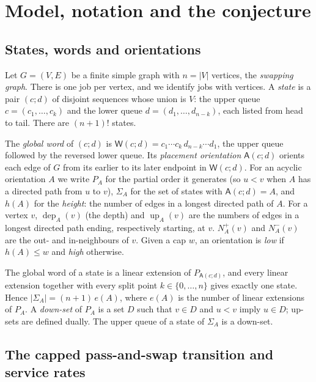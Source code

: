 \documentclass[11pt,a4paper]{article}
\theoremstyle{plain}
\theoremstyle{plain}
\newcommand{\W}{\mathsf{W}}
\newcommand{\Or}{\mathsf{A}}
\newcommand{\dep}{\operatorname{dep}}
\newcommand{\up}{\operatorname{up}}
\newcommand{\Nout}{N^{+}}
\newcommand{\Nin}{N^{-}}
\newcommand{\Sg}{\Sigma}
\begin{document}
\section{Model, notation and the conjecture}\label{sec:model}

\subsection{States, words and orientations}

Let $G=(V,E)$ be a finite simple graph with $n=|V|$ vertices, the \emph{swapping graph}. There is one job per vertex, and we identify jobs with vertices. A \emph{state} is a pair $(c;d)$ of disjoint sequences whose union is $V$: the upper queue $c=(c_1,\dots,c_k)$ and the lower queue $d=(d_1,\dots,d_{n-k})$, each listed from head to tail. There are $(n+1)!$ states.

\begin{definition}\label{def:orient}
The \emph{global word} of $(c;d)$ is $\W(c;d)=c_1\cdots c_k\,d_{n-k}\cdots d_1$, the upper queue followed by the reversed lower queue. Its \emph{placement orientation} $\Or(c;d)$ orients each edge of $G$ from its earlier to its later endpoint in $\W(c;d)$. For an acyclic orientation $A$ we write $P_A$ for the partial order it generates (so $u<v$ when $A$ has a directed path from $u$ to $v$), $\Sg_A$ for the set of states with $\Or(c;d)=A$, and $h(A)$ for the \emph{height}: the number of edges in a longest directed path of $A$. For a vertex $v$, $\dep_A(v)$ (the depth) and $\up_A(v)$ are the numbers of edges in a longest directed path ending, respectively starting, at $v$. $\Nout_A(v)$ and $\Nin_A(v)$ are the out- and in-neighbours of $v$. Given a cap $w$, an orientation is \emph{low} if $h(A)\le w$ and \emph{high} otherwise.
\end{definition}

The global word of a state is a linear extension of $P_{\Or(c;d)}$, and every linear extension together with every split point $k\in\{0,\dots,n\}$ gives exactly one state. Hence $|\Sg_A|=(n+1)\,e(A)$, where $e(A)$ is the number of linear extensions of $P_A$. A \emph{down-set} of $P_A$ is a set $D$ such that $v\in D$ and $u<v$ imply $u\in D$; up-sets are defined dually. The upper queue of a state of $\Sg_A$ is a down-set.

\subsection{The capped pass-and-swap transition and service rates}
\end{document}
